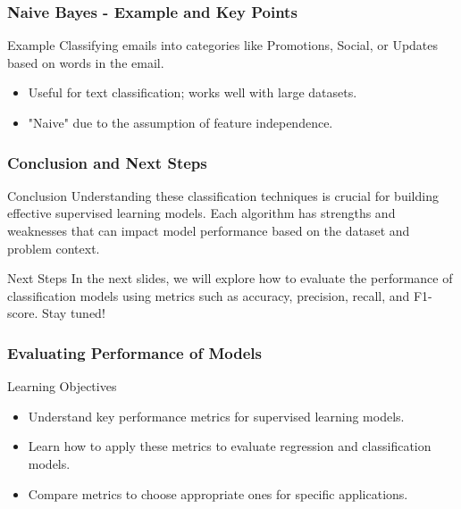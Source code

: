\documentclass[aspectratio=169]{beamer}
\begin{document}
\begin{frame}[fragile]
    \frametitle{Naive Bayes - Example and Key Points}
    \begin{block}{Example}
        Classifying emails into categories like Promotions, Social, or Updates based on words in the email.
    \end{block}
    \begin{itemize}
        \item Useful for text classification; works well with large datasets.
        \item "Naive" due to the assumption of feature independence.
    \end{itemize}
\end{frame}

\begin{frame}[fragile]
    \frametitle{Conclusion and Next Steps}
    \begin{block}{Conclusion}
        Understanding these classification techniques is crucial for building effective supervised learning models. Each algorithm has strengths and weaknesses that can impact model performance based on the dataset and problem context.
    \end{block}
    \begin{block}{Next Steps}
        In the next slides, we will explore how to evaluate the performance of classification models using metrics such as accuracy, precision, recall, and F1-score. Stay tuned!
    \end{block}
\end{frame}

\begin{frame}[fragile]
    \frametitle{Evaluating Performance of Models}
    
    \begin{block}{Learning Objectives}
        \begin{itemize}
            \item Understand key performance metrics for supervised learning models.
            \item Learn how to apply these metrics to evaluate regression and classification models.
            \item Compare metrics to choose appropriate ones for specific applications.
        \end{itemize}
    \end{block}
\end{frame}
\end{document}
